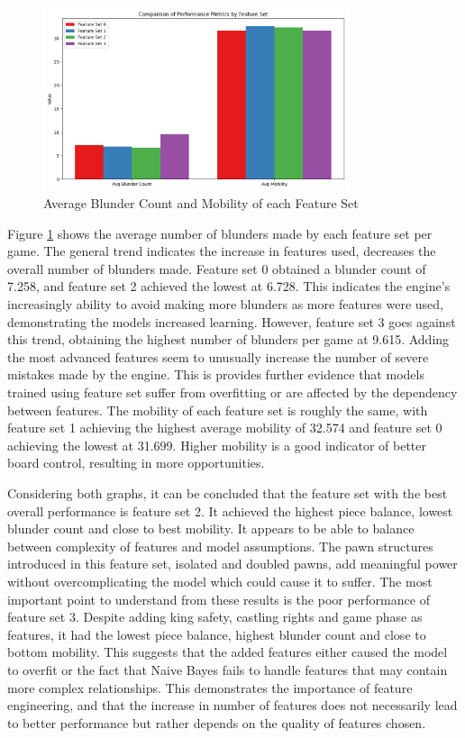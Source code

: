 \begin{figure}[H]
    \centering
    \includegraphics[width=0.8\textwidth]{images/plots/featureSet/Feature_set_vs_blunder_count_and_avg_mobility.png}
    \caption{Average Blunder Count and Mobility of each Feature Set}
    \label{fig: feature_set_vs_blunder_count_and_avg_mobility}
\end{figure}

Figure \ref{fig: feature_set_vs_blunder_count_and_avg_mobility} shows the average number of blunders made by each feature set per game. The general trend indicates the increase in features used, decreases the overall number of blunders made. Feature set 0 obtained a blunder count of 7.258, and feature set 2 achieved the  lowest at 6.728. This indicates the engine's increasingly ability to avoid making more blunders as more features were used, demonstrating the models increased learning. However, feature set 3 goes against this trend, obtaining the highest number of blunders per game at 9.615. Adding the most advanced features seem to unusually increase the number of severe mistakes made by the engine. This is provides further evidence that models trained using feature set suffer from overfitting or are affected by the dependency between features. The mobility of each feature set is roughly the same, with feature set 1 achieving the highest average mobility of 32.574 and feature set 0 achieving the lowest at 31.699. Higher mobility is a good indicator of better board control, resulting in more opportunities. 

Considering both graphs, it can be concluded that the feature set with the best overall performance is feature set 2. It achieved the highest piece balance, lowest blunder count and close to best mobility. It appears to be able to balance between complexity of features and model assumptions. The pawn structures introduced in this feature set, isolated and doubled pawns, add meaningful power without overcomplicating the model which could cause it to suffer. The most important point to understand from these results is the poor performance of feature set 3. Despite adding king safety, castling rights and game phase as features, it had the lowest piece balance, highest blunder count and close to bottom mobility. This suggests that the added features either caused the model to overfit or the fact that Naive Bayes fails to handle features that may contain more complex relationships. This demonstrates the importance of feature engineering, and that the increase in number of features does not necessarily lead to better performance but rather depends on the quality of features chosen. 


